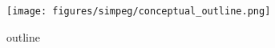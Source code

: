 \begin{figure}[!htbp]
\begin{center}
\texttt{[image: figures/simpeg/conceptual\_outline.png]}
\end{center}
\caption{
outline
}
\label{fig:simpeg-conceptual_outline}
\end{figure}
